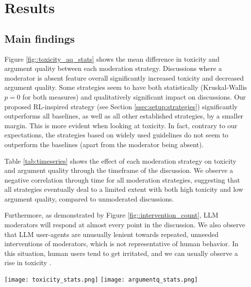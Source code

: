 %

\section{Results}

\subsection{Main findings}

Figure \ref{fig::toxicity_aq_stats} shows the mean difference in toxicity and argument quality between each moderation strategy. Discussions where a moderator is absent feature overall significantly increased toxicity and decreased argument quality. Some strategies seem to have both statistically (Kruskal-Wallis $p=0$ for both measures) and qualitatively significant impact on discussions. Our proposed \ac{RL}-inspired strategy (see Section \ref{ssec:setup:strategies}) significantly outperforms all baselines, as well as all other established strategies, by a smaller margin. This is more evident when looking at toxicity. In fact, contrary to our expectations, the strategies based on widely used guidelines do not seem to outperform the baselines (apart from the moderator being absent).

Table \ref{tab:timeseries} shows the effect of each moderation strategy on toxicity and argument quality through the timeframe of the discussion. We observe a negative correlation through time for all moderation strategies, suggesting that all strategies eventually deal to a limited extent with both high toxicity and low argument quality, compared to unmoderated discussions.

Furthermore, as demonstrated by Figure \ref{fig::intervention_count}, \ac{LLM} moderators will respond at almost every point in the discussion. We also observe that \ac{LLM} user-agents are unusually lenient towards repeated, unneeded interventions of moderators, which is not representative of human behavior. In this situation, human users tend to get irritated, and we can usually observe a rise in toxicity \cite{schaffner_community_guidelines, make_reddit_great, proactive_moderation, cresci_pesonalized_interventions}.

\begin{figure*}[t]
    \texttt{[image: toxicity\_stats.png]} \hfill
    \texttt{[image: argumentq\_stats.png]}
	\centering
	\caption{Mean difference of Toxicity (left) and Argument Quality (right) between each moderation strategy. $A[i, j] = 0.3^{***}$ indicates that the strategy $j$ is better than the strategy $i$ for an average of $0.3$ points with $p<0.001$. Each comparison is accompanied by pairwise student-t tests, in the form of significance asterisks.}
	\label{fig::toxicity_aq_stats}
\end{figure*}


